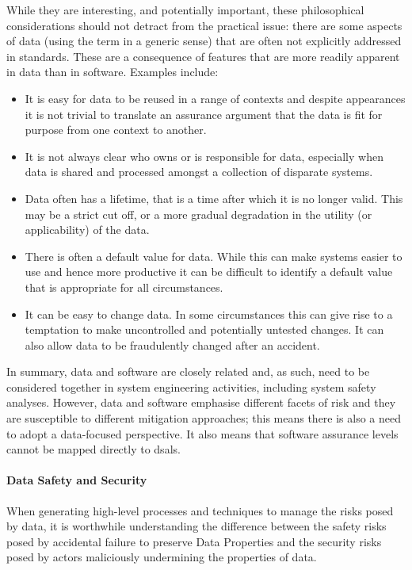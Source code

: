 While they are interesting, and potentially important, these philosophical considerations should not detract from the practical issue: there are some aspects of data (using the term in a generic sense) that are often not explicitly addressed in standards. These are a consequence of features that are more readily apparent in data than in software. Examples include:
\begin{itemize}
  \item It is easy for data to be reused in a range of contexts and despite appearances it is not trivial to translate an assurance argument that the data is fit for purpose from one context to another.
  \item It is not always clear who owns or is responsible for data, especially when data is shared and processed amongst a collection of disparate systems.
	\item Data often has a \gls{lifetime}, that is a time after which it is no longer valid. This may be a strict cut off, or a more gradual degradation in the utility (or applicability) of the data.
  \item There is often a default value for data. While this can make systems easier to use and hence more productive it can be difficult to identify a default value that is appropriate for all circumstances.
  \item It can be easy to change data. In some circumstances this can give rise to a temptation to make uncontrolled and potentially untested changes. It can also allow data to be fraudulently changed after an accident.
\end{itemize}
In summary, data and software are closely related and, as such, need to be considered together in system engineering activities, including system safety analyses. However, data and software emphasise different facets of risk and they are susceptible to different mitigation approaches; this means there is also a need to adopt a data-focused perspective. It also means that \glspl{software assurance level} cannot be mapped directly to \glspl{dsal}.

\paragraph{Data Safety and Security}
When generating high-level processes and techniques to manage the risks posed by data, it is worthwhile understanding the difference between the safety risks posed by accidental failure to preserve Data Properties and the security risks posed by actors maliciously undermining the properties of data.

